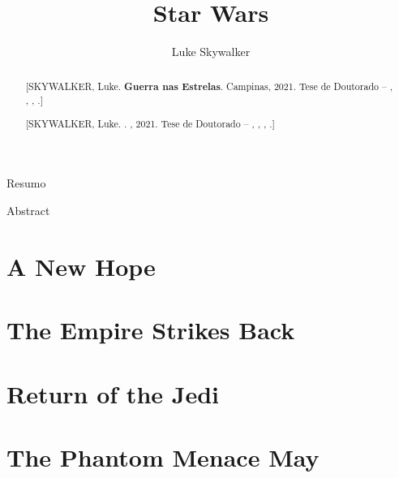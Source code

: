 \documentclass[oneside]{ifgw}
\title{Star Wars}
\author{Luke Skywalker}
\institute{Instituto de Física ``Gleb Wataghin''}
\begin{document}

\maketitle
\facepage


\abstractname{Resumo}
\begin{abstract}[SKYWALKER, Luke. \textbf{Guerra nas Estrelas}. Campinas, 2021. Tese de Doutorado -- \theinstitute, \theuniversity, \thelocation, \theyear.]
\lipsum[1-2]
\end{abstract}

\abstractname{Abstract}
\begin{abstract}[SKYWALKER, Luke. \textbf{\thetitle}. \thelocation, 2021. Tese de Doutorado -- \theinstitute, \theuniversity, \thelocation, \theyear.]
\lipsum[1-2]
\end{abstract}

\tableofcontents


\chapter{A New Hope}
\lipsum[1-10]

\chapter{The Empire Strikes Back}
\lipsum[1-10]

\chapter{Return of the Jedi}
\lipsum[1-10]

\chapter{The Phantom Menace	May}
\lipsum[1-10]
\end{document}
